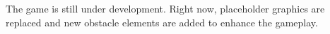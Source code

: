 The game is still under development. Right now, placeholder graphics are replaced and new obstacle elements are added to enhance the gameplay.